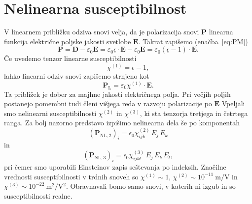\section{Nelinearna susceptibilnost}
\label{Chap:Chi}
V linearnem približku odziva snovi velja, da je polarizacija snovi 
$\mathbf{P}$ linearna funkcija električne poljske jakosti svetlobe 
$\mathbf{E}$. Takrat zapišemo (enačba~\ref{eq:PM})
\begin{equation}
\mathbf{P} = \mathbf{D} - \varepsilon_0 \mathbf{E} = 
\varepsilon_0 \underline{\epsilon} \cdot\mathbf{E} - \varepsilon_0 \mathbf{E} = 
\varepsilon_0 (\underline{\epsilon} - 1)\cdot\mathbf{E}. 
\end{equation}
Če uvedemo tenzor linearne susceptibilnosti
\begin{equation}
\chi^{(1)} = \underline{\epsilon} - 1,
\end{equation}
lahko linearni odziv snovi zapišemo strnjeno kot
\begin{equation}
\mathbf{P}_{\mathrm{L}} =  \varepsilon_0 \chi^{(1)} \cdot \mathbf{E}.
\end{equation}
Ta približek je dober za majhne jakosti električnega polja. Pri večjih poljih
postanejo pomembni tudi členi višjega reda v razvoju polarizacije
po $\mathbf{E}$
Vpeljali smo nelinearni susceptibilnosti 
$\chi^{(2)}$ in $\chi^{(3)}$, ki sta tenzorja tretjega in četrtega ranga. 
Za bolj nazorno predstavo izpišimo nelinearna dela še po komponentah
\begin{equation}
\left(\mathbf{P}_{\mathrm{NL,2}}\right)_i= \epsilon_{0}\chi^{(2)}_{ijk} \,E_j \,E_k
\label{eq:nlin2}
\end{equation}
in 
\begin{equation}
\left(\mathbf{P}_{\mathrm{NL,3}}\right)_i= \epsilon_{0}\chi^{(3)}_{ijkl} \,E_j \,E_k\, E_l,
\label{eq:nlin3}
\end{equation}
pri čemer smo uporabili Einsteinov zapis seštevanja po indeksih. Značilne vrednosti
susceptibilnosti v trdnih snoveh so $\chi^{(1)} \sim 1$, 
$\chi^{(2)} \sim 10^{-11}~\si{\metre/\volt}$ 
in $\chi^{(3)} \sim 10^{-22}~\si{\metre^2/\volt^2}$. Obravnavali bomo samo snovi, v katerih
ni izgub in so susceptibilnosti realne.

